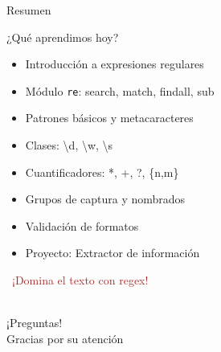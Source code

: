 \documentclass{beamer}
\begin{document}
\begin{frame}{Resumen \faListUl}
\begin{conceptbox}{¿Qué aprendimos hoy?}
\small
\begin{itemize}
    \item[\faCheck] Introducción a expresiones regulares
    \item[\faCheck] Módulo \texttt{re}: search, match, findall, sub
    \item[\faCheck] Patrones básicos y metacaracteres
    \item[\faCheck] Clases: \textbackslash d, \textbackslash w, \textbackslash s
    \item[\faCheck] Cuantificadores: *, +, ?, \{n,m\}
    \item[\faCheck] Grupos de captura y nombrados
    \item[\faCheck] Validación de formatos
    \item[\faCheck] Proyecto: Extractor de información
\end{itemize}
\end{conceptbox}

\vspace{0.3cm}
\begin{center}
\large\textcolor{brown}{\faSearch\ ¡Domina el texto con regex!}
\end{center}
\end{frame}

\begin{frame}
\begin{center}
\Huge\textcolor{brown}{\faQuestionCircle}\\
\vspace{0.5cm}
\Huge ¡Preguntas!\\
\vspace{1cm}
\Large\textcolor{brownbright}{Gracias por su atención}
\end{center}
\end{frame}
\end{document}
